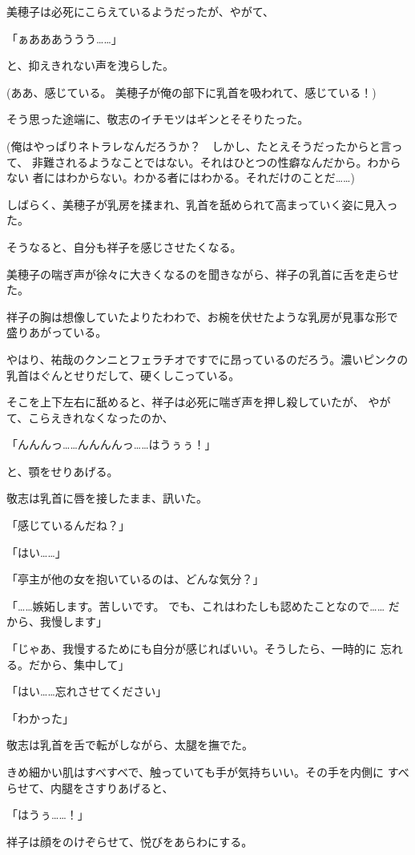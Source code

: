 ﻿\documentclass[
    book,tate,
    line_length=30zw,
    jafontsize=12pt,
    paper=b5j,
    landscape,
    ]{jlreq}
\begin{document}
美穂子は必死にこらえているようだったが、やがて、

「ぁあああううう……」

と、抑えきれない声を洩らした。

(ああ、感じている。 美穂子が俺の部下に乳首を吸われて、感じている！)

そう思った途端に、敬志のイチモツはギンとそそりたった。

(俺はやっぱりネトラレなんだろうか？　しかし、たとえそうだったからと言って、
非難されるようなことではない。それはひとつの性癖なんだから。わからない
者にはわからない。わかる者にはわかる。それだけのことだ……)

しばらく、美穂子が乳房を揉まれ、乳首を舐められて高まっていく姿に見入った。

そうなると、自分も祥子を感じさせたくなる。

美穂子の喘ぎ声が徐々に大きくなるのを聞きながら、祥子の乳首に舌を走らせた。

祥子の胸は想像していたよりたわわで、お椀を伏せたような乳房が見事な形で
盛りあがっている。

やはり、祐哉のクンニとフェラチオですでに昂っているのだろう。濃いピンクの
乳首はぐんとせりだして、硬くしこっている。

そこを上下左右に舐めると、祥子は必死に喘ぎ声を押し殺していたが、
やがて、こらえきれなくなったのか、

「んんんっ……んんんんっ……はうぅぅ！」

と、顎をせりあげる。

敬志は乳首に唇を接したまま、訊いた。

「感じているんだね？」

「はい……」

「亭主が他の女を抱いているのは、どんな気分？」

「……嫉妬します。苦しいです。 でも、これはわたしも認めたことなので……
だから、我慢します」

「じゃあ、我慢するためにも自分が感じればいい。そうしたら、一時的に
忘れる。だから、集中して」

「はい……忘れさせてください」

「わかった」

敬志は乳首を舌で転がしながら、太腿を撫でた。

きめ細かい肌はすべすべで、触っていても手が気持ちいい。その手を内側に
すべらせて、内腿をさすりあげると、

「はうぅ……！」

祥子は顔をのけぞらせて、悦びをあらわにする。
\end{document}
